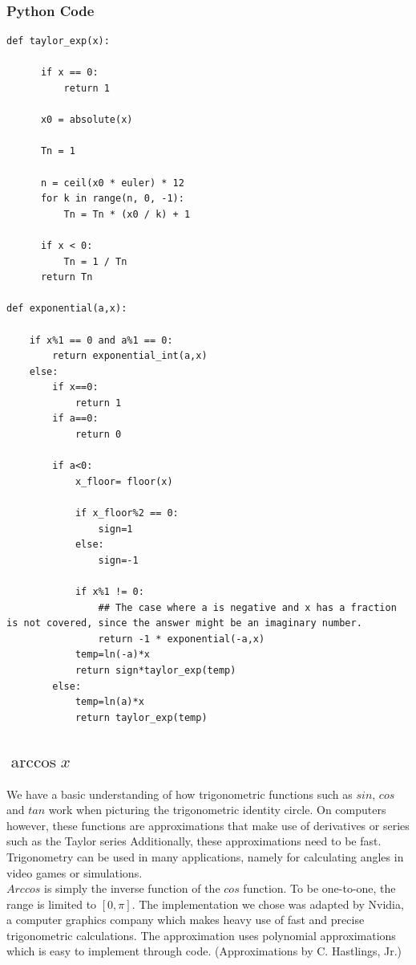 \documentclass[11pt,onside]{report}
\begin{document}
\subsubsection{Python Code}
\begin{lstlisting}
def taylor_exp(x):    
     
      if x == 0:
          return 1
      
      x0 = absolute(x)
     
      Tn = 1
      
      n = ceil(x0 * euler) * 12
      for k in range(n, 0, -1):
          Tn = Tn * (x0 / k) + 1
     
      if x < 0:
          Tn = 1 / Tn
      return Tn
      
def exponential(a,x):

    if x%1 == 0 and a%1 == 0:
        return exponential_int(a,x)
    else:
        if x==0:
            return 1
        if a==0:
            return 0

        if a<0:
            x_floor= floor(x)

            if x_floor%2 == 0:
                sign=1
            else:
                sign=-1

            if x%1 != 0:
                ## The case where a is negative and x has a fraction is not covered, since the answer might be an imaginary number.
                return -1 * exponential(-a,x)
            temp=ln(-a)*x
            return sign*taylor_exp(temp)
        else:
            temp=ln(a)*x
            return taylor_exp(temp)
\end{lstlisting}

\subsection{$\arccos{x}$}
We have a basic understanding of how trigonometric functions such as $sin$, $cos$ and $tan$ work when picturing the trigonometric identity circle. On computers however, these functions are approximations that make use of derivatives or series such as the Taylor series \cite[p.~81]{handbook-math} Additionally, these approximations need to be fast. Trigonometry can be used in many applications, namely for calculating angles in video games or simulations. \\

$Arccos$ is simply the inverse function of the $cos$ function. To be one-to-one, the range is limited to $[0,\pi]$. The implementation we chose was adapted by Nvidia, a computer graphics company which makes heavy use of fast and precise trigonometric calculations. The approximation uses polynomial approximations which is easy to implement through code. (Approximations by C. Hastlings, Jr.) \cite{approx-for-digital} \\
\end{document}
